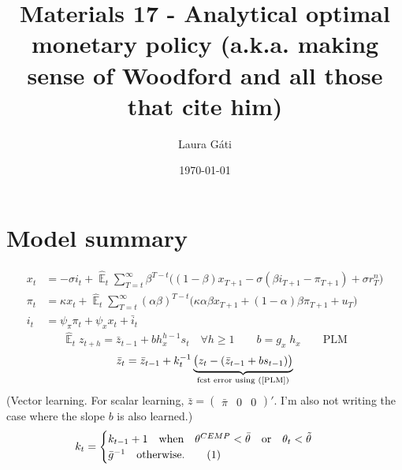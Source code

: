 \documentclass[11pt]{article}
\renewcommand{\[}{\begin{equation}}
\renewcommand{\]}{\end{equation}}
\DeclareMathOperator{\E}{\mathbb{E}}
\newcommand\numberthis{\addtocounter{equation}{1}\tag{\theequation}} %
\begin{document}
\linespread{1.0}

\title{Materials 17 - Analytical optimal monetary policy (a.k.a. making sense of Woodford and all those that cite him)}
\author{Laura G\'ati} 
\date{\today}
\maketitle


\tableofcontents


\newpage
\section{Model summary}
\begin{align}
x_t &=  -\sigma i_t +\hat{\E}_t \sum_{T=t}^{\infty} \beta^{T-t }\big( (1-\beta)x_{T+1} - \sigma(\beta i_{T+1} - \pi_{T+1}) +\sigma r_T^n \big)  \label{prestons18}  \\
\pi_t &= \kappa x_t +\hat{\E}_t \sum_{T=t}^{\infty} (\alpha\beta)^{T-t }\big( \kappa \alpha \beta x_{T+1} + (1-\alpha)\beta \pi_{T+1} + u_T\big) \label{prestons19}  \\
i_t &= \psi_{\pi}\pi_t + \psi_{x} x_t  + \bar{i}_t \label{TR}
\end{align}
\begin{equation}
\hat{\E}_t z_{t+h} =  \bar{z}_{t-1} + bh_x^{h-1}s_t  \quad \forall h\geq 1 \quad \quad b = g_x\; h_x \quad \quad \text{PLM} \label{PLM}
\end{equation}
\begin{equation}
\bar{z}_{t} = \bar{z}_{t-1} +k_t^{-1}\underbrace{\big(z_{t} -(\bar{z}_{t-1}+bs_{t-1}) \big)}_{\text{fcst error using (\ref{PLM})} } 
\end{equation}
(Vector learning. For scalar learning, $\bar{z}= \begin{pmatrix} \bar{\pi} & 0 & 0\end{pmatrix}' $. I'm also not writing the case where the slope $b$ is also learned.)
 \begin{align*}
k_t & = \begin{cases} k_{t-1}+1 \quad \text{when} \quad \theta^{CEMP} < \bar{\theta} \quad \text{or}  \quad  \theta_t < \tilde{\theta}  \\ \bar{g}^{-1}  \quad \text{otherwise.}\numberthis
\end{cases} 
\end{align*}
\end{document}
